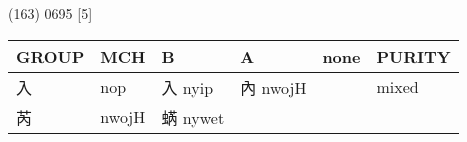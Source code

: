 \documentclass[14pt,a4paper]{scrartcl}
\begin{document}
(163) 0695 {[}5{]}

\begin{longtable}[c]{@{}llllll@{}}
\toprule
\begin{minipage}[b]{0.14\columnwidth}\raggedright\strut
GROUP
\strut\end{minipage} &
\begin{minipage}[b]{0.14\columnwidth}\raggedright\strut
MCH
\strut\end{minipage} &
\begin{minipage}[b]{0.14\columnwidth}\raggedright\strut
B
\strut\end{minipage} &
\begin{minipage}[b]{0.14\columnwidth}\raggedright\strut
A
\strut\end{minipage} &
\begin{minipage}[b]{0.14\columnwidth}\raggedright\strut
none
\strut\end{minipage} &
\begin{minipage}[b]{0.14\columnwidth}\raggedright\strut
PURITY
\strut\end{minipage}\tabularnewline
\midrule
\endhead
\begin{minipage}[t]{0.14\columnwidth}\raggedright\strut
入
\strut\end{minipage} &
\begin{minipage}[t]{0.14\columnwidth}\raggedright\strut
nop
\strut\end{minipage} &
\begin{minipage}[t]{0.14\columnwidth}\raggedright\strut
入 nyip
\strut\end{minipage} &
\begin{minipage}[t]{0.14\columnwidth}\raggedright\strut
內 nwojH
\strut\end{minipage} &
\begin{minipage}[t]{0.14\columnwidth}\raggedright\strut
\strut\end{minipage} &
\begin{minipage}[t]{0.14\columnwidth}\raggedright\strut
mixed
\strut\end{minipage}\tabularnewline
\begin{minipage}[t]{0.14\columnwidth}\raggedright\strut
芮
\strut\end{minipage} &
\begin{minipage}[t]{0.14\columnwidth}\raggedright\strut
nwojH
\strut\end{minipage} &
\begin{minipage}[t]{0.14\columnwidth}\raggedright\strut
蜹 nywet
\strut\end{minipage} &

\end{longtable}
\end{document}
